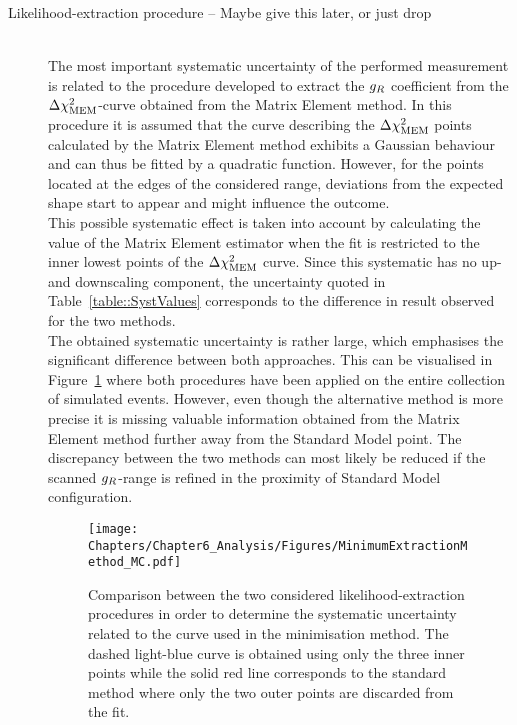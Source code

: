 \begin{myindentpar}
  \begin{description}
    \item[Likelihood-extraction procedure -- Maybe give this later, or just drop] \hfill \\
    The most important systematic uncertainty of the performed measurement is related to the procedure developed to extract the $g_{R}$ coefficient from the $\Delta \chi^{2}_{\textrm{MEM}}$-curve obtained from the Matrix Element method.
    In this procedure it is assumed that the curve describing the $\Delta \chi^{2}_{\textrm{MEM}}$ points calculated by the Matrix Element method exhibits a Gaussian behaviour and can thus be fitted by a quadratic function.
    However, for the points located at the edges of the considered range, deviations from the expected shape start to appear and might influence the outcome.
    \\
    This possible systematic effect is taken into account by calculating the value of the Matrix Element estimator when the fit is restricted to the inner lowest points of the $\Delta \chi^{2}_{\textrm{MEM}}$ curve.
    Since this systematic has no up- and downscaling component, the uncertainty quoted in Table~\ref{table::SystValues} corresponds to the difference in result observed for the two methods.
    \\
    The obtained systematic uncertainty is rather large, which emphasises the significant difference between both approaches. This can be visualised in Figure~\ref{fig::MethodDiff} where both procedures have been applied on the entire collection of simulated events. 
    However, even though the alternative method is more precise it is missing valuable information obtained from the Matrix Element method further away from the Standard Model point. %
    The discrepancy between the two methods can most likely be reduced if the scanned $g_{R}$-range is refined in the proximity of Standard Model configuration.
    \begin{figure}[h!t]
      \centering
      \texttt{[image: Chapters/Chapter6\_Analysis/Figures/MinimumExtractionMethod\_MC.pdf]}
      \caption{Comparison between the two considered likelihood-extraction procedures in order to determine the systematic uncertainty related to the curve used in the minimisation method. The dashed light-blue curve is obtained using only the three inner points while the solid red line corresponds to the standard method where only the two outer points are discarded from the fit.} \label{fig::MethodDiff}
     \end{figure}


\end{description}
\end{myindentpar}
